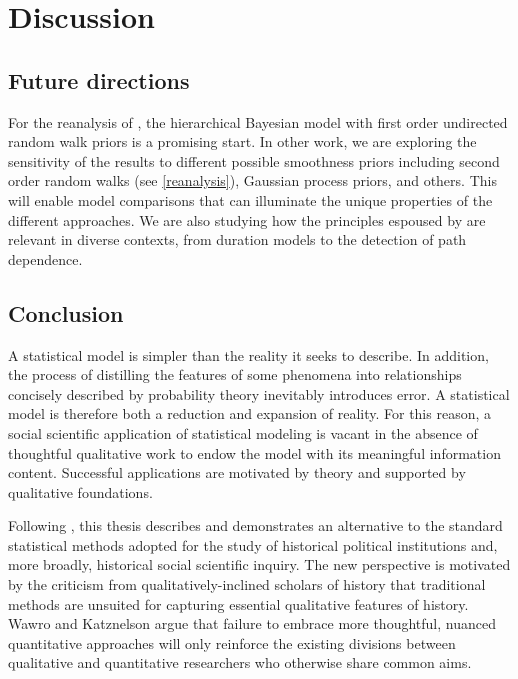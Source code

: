 \chapter{Discussion}
\label{discussion}

\section{Future directions}

For the reanalysis of , the hierarchical Bayesian model with first order 
undirected random walk priors is a promising start. In other work, we are exploring the sensitivity of the 
results to different possible smoothness priors including second order random walks (see \ref{reanalysis}), 
Gaussian process priors, and others. This will enable model comparisons that can illuminate the unique 
properties of the different approaches. We are also studying how the principles 
espoused by  are relevant in diverse contexts, from 
duration models to the detection of path dependence. 
 
\section{Conclusion}

A statistical model is simpler than the reality it seeks to describe. In addition, the 
process of distilling the features of some phenomena into relationships concisely 
described by probability theory inevitably introduces error. A statistical model is 
therefore both a reduction and expansion of reality. For this reason, a social scientific 
application of statistical modeling is vacant in the absence of thoughtful qualitative 
work to endow the model with its meaningful information content. Successful 
applications are motivated by theory and supported by qualitative foundations. 

Following , this thesis describes and demonstrates 
an alternative to the standard statistical methods adopted for the study of historical 
political institutions and, more broadly, historical social scientific inquiry. The new perspective is 
motivated by the criticism from qualitatively-inclined scholars of history that traditional methods 
are unsuited for capturing essential qualitative features of history. 
Wawro and Katznelson argue that failure to embrace more thoughtful, nuanced quantitative 
approaches will only reinforce the existing divisions between qualitative and quantitative 
researchers who otherwise share common aims. 

